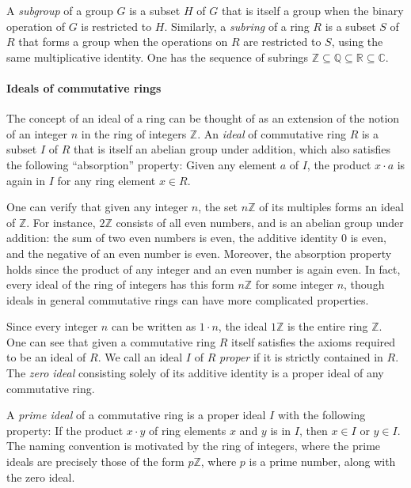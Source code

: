 \documentclass[referee,sn-mathphys]{sn-jnl}
\theoremstyle{definition}
\theoremstyle{remark}
\numberwithin{equation}{section}
\numberwithin{figure}{subsection}
\begin{document}
A \emph{subgroup} of a group $G$ is a subset  $H$ of $G$ that is itself a 
group when the binary operation of $G$ is restricted to $H$.
Similarly, a \emph{subring} of a ring $R$
is a subset $S$ of $R$ that forms a group when the operations on $R$ are 
restricted to $S$, using the same multiplicative identity.  
One has the sequence of subrings $\mathbb{Z} \subseteq \mathbb{Q} \subseteq \mathbb{R} \subseteq \mathbb{C}$. 

\paragraph{Ideals of commutative rings}
The concept of an {ideal} of a ring can be thought of as an extension of the
notion of an integer $n$ in the ring of integers $\mathbb{Z}$. An \emph{ideal}
of commutative ring $R$ is a subset $I$ of $R$ that is itself an abelian group
under addition, which also satisfies the following ``absorption'' property:
Given any element $a$ of $I$, the product  $x \cdot a$ is again in $I$ for any
ring element $x \in R$. 

One can verify that given any integer $n$, the set $n\mathbb{Z}$ of its
multiples forms an ideal of $\mathbb{Z}$. For instance, $2 \mathbb{Z}$
consists of all even numbers, and is an abelian group under addition: the sum
of two even numbers is even, the additive identity $0$ is even, and the
negative of an even number is even. Moreover, the absorption property holds
since the product of any integer and an even number is again even. In fact,
every ideal of the ring of integers has this form $n\mathbb{Z}$ for some
integer $n$, though ideals in general commutative rings can have more
complicated properties. 

Since every integer $n$ can be written as $1 \cdot n$, the ideal $1 \mathbb{Z}$
is the entire ring $\mathbb{Z}$. One can see that given a commutative ring
$R$ itself satisfies the axioms required to be an ideal of $R$. We call an
ideal $I$ of $R$ \emph{proper} if it is strictly contained in $R$. The
\emph{zero ideal} consisting solely of its additive identity is a proper ideal
of any commutative ring. 

A \emph{prime ideal} of a commutative ring is a proper ideal $I$ with the
following property:   If the product $x \cdot y$ of ring elements $x$ and $y$
is in $I$, then $x \in I$ or $y \in I$. The naming convention is motivated by
the ring of integers, where the prime ideals are precisely those  of the form
$p\mathbb{Z}$, where $p$ is a prime number, along with the zero ideal. 
\end{document}
